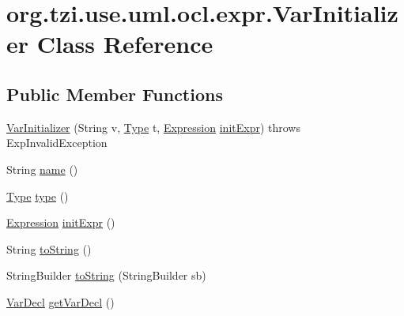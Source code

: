 \hypertarget{classorg_1_1tzi_1_1use_1_1uml_1_1ocl_1_1expr_1_1_var_initializer}{\section{org.\-tzi.\-use.\-uml.\-ocl.\-expr.\-Var\-Initializer Class Reference}
\label{classorg_1_1tzi_1_1use_1_1uml_1_1ocl_1_1expr_1_1_var_initializer}
}
\subsection*{Public Member Functions}
\begin{DoxyCompactItemize}
\item 
\hyperlink{classorg_1_1tzi_1_1use_1_1uml_1_1ocl_1_1expr_1_1_var_initializer_a6ab4bdbf9bb88d931f22ff9774ee4f91}{Var\-Initializer} (String v, \hyperlink{interfaceorg_1_1tzi_1_1use_1_1uml_1_1ocl_1_1type_1_1_type}{Type} t, \hyperlink{classorg_1_1tzi_1_1use_1_1uml_1_1ocl_1_1expr_1_1_expression}{Expression} \hyperlink{classorg_1_1tzi_1_1use_1_1uml_1_1ocl_1_1expr_1_1_var_initializer_a91b7e7316fdc0110d093de3817da95b9}{init\-Expr})  throws Exp\-Invalid\-Exception     
\item 
String \hyperlink{classorg_1_1tzi_1_1use_1_1uml_1_1ocl_1_1expr_1_1_var_initializer_a9078ea0053d87a939cb0b421a19c87eb}{name} ()
\item 
\hyperlink{interfaceorg_1_1tzi_1_1use_1_1uml_1_1ocl_1_1type_1_1_type}{Type} \hyperlink{classorg_1_1tzi_1_1use_1_1uml_1_1ocl_1_1expr_1_1_var_initializer_a7b323d6435667a0d2da5cea5f411d3b9}{type} ()
\item 
\hyperlink{classorg_1_1tzi_1_1use_1_1uml_1_1ocl_1_1expr_1_1_expression}{Expression} \hyperlink{classorg_1_1tzi_1_1use_1_1uml_1_1ocl_1_1expr_1_1_var_initializer_a91b7e7316fdc0110d093de3817da95b9}{init\-Expr} ()
\item 
String \hyperlink{classorg_1_1tzi_1_1use_1_1uml_1_1ocl_1_1expr_1_1_var_initializer_a08744bc48fd2672f008b5d5bf2afddcd}{to\-String} ()
\item 
String\-Builder \hyperlink{classorg_1_1tzi_1_1use_1_1uml_1_1ocl_1_1expr_1_1_var_initializer_a92fc55579dc69f6e9a4a924bb4bb8c41}{to\-String} (String\-Builder sb)
\item 
\hyperlink{classorg_1_1tzi_1_1use_1_1uml_1_1ocl_1_1expr_1_1_var_decl}{Var\-Decl} \hyperlink{classorg_1_1tzi_1_1use_1_1uml_1_1ocl_1_1expr_1_1_var_initializer_a834d4d1a47d27dd3e3ab97da3a62a3ee}{get\-Var\-Decl} ()
\end{DoxyCompactItemize}
